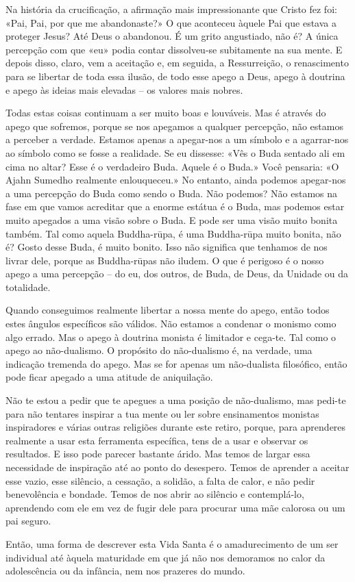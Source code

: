 Na história da crucificação, a afirmação mais impressionante que Cristo fez foi:
«Pai, Pai, por que me abandonaste?» O que aconteceu àquele Pai que estava a
proteger Jesus? Até Deus o abandonou. É um grito angustiado, não é? A única
percepção com que «eu» podia contar dissolveu-se subitamente na sua mente. E
depois disso, claro, vem a aceitação e, em seguida, a Ressurreição, o
renascimento para se libertar de toda essa ilusão, de todo esse apego a Deus,
apego à doutrina e apego às ideias mais elevadas -- os valores mais nobres.

Todas estas coisas continuam a ser muito boas e louváveis. Mas é através do
apego que sofremos, porque se nos apegamos a qualquer percepção, não estamos a
perceber a verdade. Estamos apenas a apegar-nos a um símbolo e a agarrar-nos
ao símbolo como se fosse a realidade. Se eu dissesse: «Vês o Buda sentado ali em
cima no altar? Esse é o verdadeiro Buda. Aquele é o Buda.» Você pensaria: «O
Ajahn Sumedho realmente enlouqueceu.» No entanto, ainda podemos apegar-nos a
uma percepção do Buda como sendo o Buda. Não podemos? Não estamos na fase em que
vamos acreditar que a enorme estátua é o Buda, mas podemos estar muito apegados
a uma visão sobre o Buda. E pode ser uma visão muito bonita também. Tal como
aquela Buddha-rūpa, é uma Buddha-rūpa muito bonita, não é? Gosto desse Buda, é
muito bonito. Isso não significa que tenhamos de nos livrar dele, porque as
Buddha-rūpas não iludem. O que é perigoso é o nosso apego a uma percepção -- do
eu, dos outros, de Buda, de Deus, da Unidade ou da totalidade.

Quando conseguimos realmente libertar a nossa mente do apego, então todos estes
ângulos específicos são válidos. Não estamos a condenar o monismo como algo
errado. Mas o apego à doutrina monista é limitador e cega-te. Tal como o apego
ao não-dualismo. O propósito do não-dualismo é, na verdade, uma indicação
tremenda do apego. Mas se for apenas um não-dualista filosófico, então pode
ficar apegado a uma atitude de aniquilação.

Não te estou a pedir que te apegues a uma posição de não-dualismo, mas pedi-te
para não tentares inspirar a tua mente ou ler sobre ensinamentos monistas
inspiradores e várias outras religiões durante este retiro, porque, para
aprenderes realmente a usar esta ferramenta específica, tens de a usar e
observar os resultados. E isso pode parecer bastante árido. Mas temos de largar
essa necessidade de inspiração até ao ponto do desespero. Temos de aprender a
aceitar esse vazio, esse silêncio, a cessação, a solidão, a falta de calor, e
não pedir benevolência e bondade. Temos de nos abrir ao silêncio e
contemplá-lo, aprendendo com ele em vez de fugir dele para procurar uma mãe
calorosa ou um pai seguro.

Então, uma forma de descrever esta Vida Santa é o amadurecimento de um ser
individual até àquela maturidade em que já não nos demoramos no calor da
adolescência ou da infância, nem nos prazeres do mundo.


